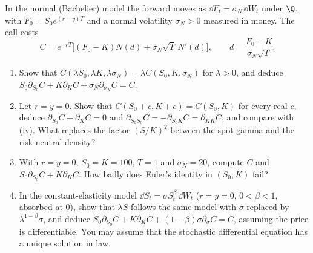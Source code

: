 \begin{exercise}\label{ex:sr-homogeneity}
\medium In the normal (Bachelier) model the forward moves as $\dd F_t=\sigma_N\,\dd W_t$ under $\Q$, with $F_0=S_0e^{(r-y)T}$
and a normal volatility $\sigma_N>0$ measured in money. The call costs
\[
  C=e^{-rT}\big[(F_0-K)N(d)+\sigma_N\sqrt T\,N'(d)\big],\qquad d=\frac{F_0-K}{\sigma_N\sqrt T}.
\]
\begin{enumerate}[label=(\alph*)]
  \item Show that $C(\lambda S_0,\lambda K,\lambda\sigma_N)=\lambda C(S_0,K,\sigma_N)$ for $\lambda>0$, and deduce
    $S_0\partial_{S_0}C+K\partial_KC+\sigma_N\partial_{\sigma_N}C=C$.
  \item Let $r=y=0$. Show that $C(S_0+c,K+c)=C(S_0,K)$ for every real $c$, deduce $\partial_{S_0}C+\partial_KC=0$ and
    $\partial_{S_0S_0}C=-\partial_{S_0K}C=\partial_{KK}C$, and compare with (iv). What replaces the
    factor $(S/K)^2$ between the spot gamma and the risk-neutral density?
  \item With $r=y=0$, $S_0=K=100$, $T=1$ and $\sigma_N=20$, compute $C$ and $S_0\partial_{S_0}C+K\partial_KC$. How badly does
    Euler's identity in $(S_0,K)$ fail?
  \item In the constant-elasticity model $\dd S_t=\sigma S_t^\beta\,\dd W_t$ ($r=y=0$, $0<\beta<1$, absorbed at $0$), show
    that $\lambda S$ follows the same model with $\sigma$ replaced by $\lambda^{1-\beta}\sigma$, and deduce
    $S_0\partial_{S_0}C+K\partial_KC+(1-\beta)\sigma\partial_\sigma C=C$, assuming the price is differentiable. You may
    assume that the stochastic differential equation has a unique solution in law.
\end{enumerate}
\end{exercise}

